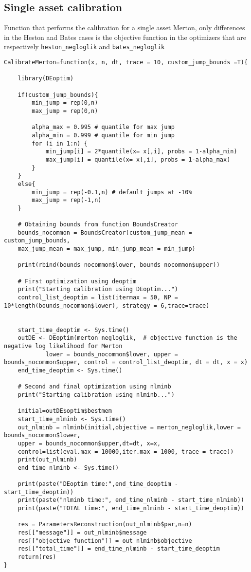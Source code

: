 \subsection{Single asset calibration}
\bigskip
\noindent
Function that performs the calibration for a single asset Merton, only differences in the Heston and Bates cases is the objective function in the optimizers that are respectively  \texttt{heston\_negloglik} and \texttt{bates\_negloglik}
\begin{lstlisting}
CalibrateMerton=function(x, n, dt, trace = 10, custom_jump_bounds =T){
	
	library(DEoptim)
	
	if(custom_jump_bounds){
		min_jump = rep(0,n)
		max_jump = rep(0,n)
		
		alpha_max = 0.995 # quantile for max jump
		alpha_min = 0.999 # quantile for min jump
		for (i in 1:n) {
			min_jump[i] = 2*quantile(x= x[,i], probs = 1-alpha_min)
			max_jump[i] = quantile(x= x[,i], probs = 1-alpha_max)
		}
	}
	else{
		min_jump = rep(-0.1,n) # default jumps at -10%
		max_jump = rep(-1,n)
	}
	
	# Obtaining bounds from function BoundsCreator
	bounds_nocommon = BoundsCreator(custom_jump_mean = custom_jump_bounds,
	max_jump_mean = max_jump, min_jump_mean = min_jump)
	
	print(rbind(bounds_nocommon$lower, bounds_nocommon$upper))
	
	# First optimization using deoptim
	print("Starting calibration using DEoptim...")
	control_list_deoptim = list(itermax = 50, NP = 10*length(bounds_nocommon$lower), strategy = 6,trace=trace)
	
	
	start_time_deoptim <- Sys.time()
	outDE <- DEoptim(merton_negloglik,  # objective function is the negative log likelihood for Merton
			lower = bounds_nocommon$lower, upper = bounds_nocommon$upper, control = control_list_deoptim, dt = dt, x = x)
	end_time_deoptim <- Sys.time()
	
	# Second and final optimization using nlminb
	print("Starting calibration using nlminb...")
	
	initial=outDE$optim$bestmem
	start_time_nlminb <- Sys.time()
	out_nlminb = nlminb(initial,objective = merton_negloglik,lower = bounds_nocommon$lower,
	upper = bounds_nocommon$upper,dt=dt, x=x,
	control=list(eval.max = 10000,iter.max = 1000, trace = trace))
	print(out_nlminb)
	end_time_nlminb <- Sys.time()
	
	print(paste("DEoptim time:",end_time_deoptim - start_time_deoptim))
	print(paste("nlminb time:", end_time_nlminb - start_time_nlminb))
	print(paste("TOTAL time:", end_time_nlminb - start_time_deoptim))
	
	res = ParametersReconstruction(out_nlminb$par,n=n)
	res[["message"]] = out_nlminb$message
	res[["objective_function"]] = out_nlminb$objective
	res[["total_time"]] = end_time_nlminb - start_time_deoptim
	return(res)
}
\end{lstlisting}


